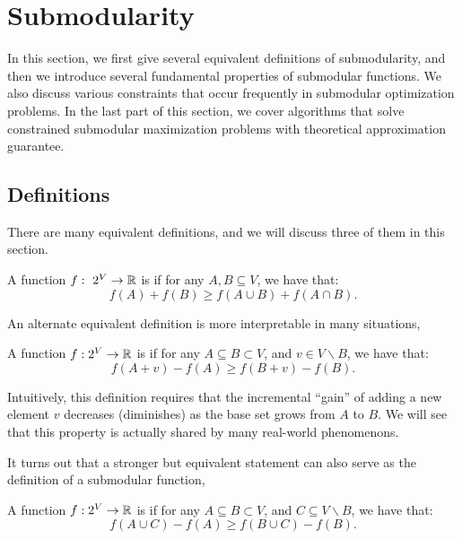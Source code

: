 
\section{Submodularity}
In this section, we first give several equivalent definitions of submodularity, and then we introduce several fundamental properties of submodular functions. We also discuss various constraints that occur frequently in submodular optimization problems. In the last part of this section, we cover algorithms that solve constrained submodular maximization problems with theoretical approximation guarantee. 

\subsection{Definitions}
There are many equivalent definitions, and we will discuss three of them in this section. 

\begin{definition}
  \label{def:sub-concave}
  A function $f:~2^V \rightarrow \mathbb{R}$ is  if for any $A, B \subseteq V$, we have that:
  \begin{equation}
    \label{eq:sub-concave}
    f(A) + f(B) \geq f(A \cup B) + f(A \cap B).
  \end{equation}
\end{definition}

An alternate equivalent definition is more interpretable in many situations,

\begin{definition}
  \label{def:sub-diminishing}
  A function $f: 2^V \rightarrow \mathbb{R}$ is  if for any $A \subseteq B \subset V$, and $v \in V\backslash B$, we have that:
  \begin{equation}
    \label{eq:sub-diminishing}
    f(A + v) - f(A) \geq f(B + v) - f(B).
  \end{equation}
\end{definition}

Intuitively, this definition requires that the incremental ``gain'' of adding a new element $v$ decreases (diminishes) as the base set grows from $A$ to $B$. We will see that this property is actually shared by many real-world phenomenons.

It turns out that a stronger but equivalent statement can also serve as the definition of a submodular function,

\begin{definition}
  \label{def:sub-diminishing-group}
  A function $f: 2^V \rightarrow \mathbb{R}$ is  if for any $A \subseteq B \subset V$, and $C \subseteq V\backslash B$, we have that:
  \begin{equation}
    \label{eq:sub-diminishing-group}
    f(A \cup C) - f(A) \geq f(B \cup C) - f(B).
  \end{equation}
\end{definition}


